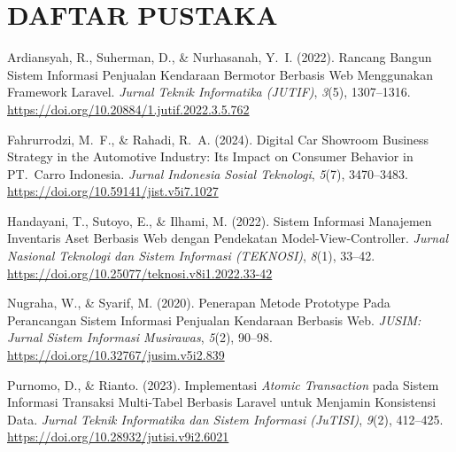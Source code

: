 \documentclass[11pt, a5paper]{article}
\begin{document}
\section*{DAFTAR PUSTAKA}


\begin{enumerate}[label={[\arabic*]}, leftmargin=*, itemsep=8pt]


  \item %
        Ardiansyah, R., Suherman, D., \& Nurhasanah, Y.~I. (2022).
        Rancang Bangun Sistem Informasi Penjualan Kendaraan Bermotor
        Berbasis Web Menggunakan Framework Laravel.
        \textit{Jurnal Teknik Informatika (JUTIF)}, \textit{3}(5),
        1307--1316.
        \url{https://doi.org/10.20884/1.jutif.2022.3.5.762}

  \item %
        Fahrurrodzi, M.~F., \& Rahadi, R.~A. (2024).
        Digital Car Showroom Business Strategy in the Automotive
        Industry: Its Impact on Consumer Behavior in PT.\ Carro
        Indonesia.
        \textit{Jurnal Indonesia Sosial Teknologi}, \textit{5}(7),
        3470--3483.
        \url{https://doi.org/10.59141/jist.v5i7.1027}

  \item %
        Handayani, T., Sutoyo, E., \& Ilhami, M. (2022).
        Sistem Informasi Manajemen Inventaris Aset Berbasis Web
        dengan Pendekatan Model-View-Controller.
        \textit{Jurnal Nasional Teknologi dan Sistem Informasi
        (TEKNOSI)}, \textit{8}(1), 33--42.
        \url{https://doi.org/10.25077/teknosi.v8i1.2022.33-42}

  \item %
        Nugraha, W., \& Syarif, M. (2020).
        Penerapan Metode Prototype Pada Perancangan Sistem Informasi
        Penjualan Kendaraan Berbasis Web.
        \textit{JUSIM: Jurnal Sistem Informasi Musirawas},
        \textit{5}(2), 90--98.
        \url{https://doi.org/10.32767/jusim.v5i2.839}

  \item %
        Purnomo, D., \& Rianto. (2023).
        Implementasi \textit{Atomic Transaction} pada Sistem
        Informasi Transaksi Multi-Tabel Berbasis Laravel untuk
        Menjamin Konsistensi Data.
        \textit{Jurnal Teknik Informatika dan Sistem Informasi
        (JuTISI)}, \textit{9}(2), 412--425.
        \url{https://doi.org/10.28932/jutisi.v9i2.6021}


\end{enumerate}
\end{document}

